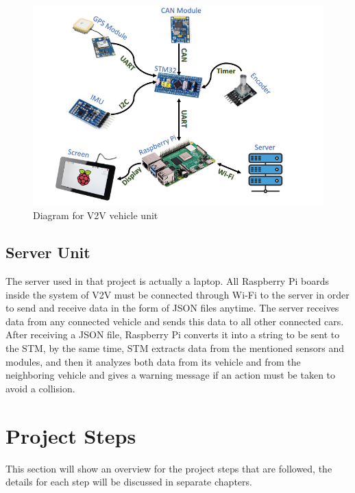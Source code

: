 \begin{figure}
    \centering
    \includegraphics[width = \textwidth]{figure/2_1_1.PNG}
    
    \caption{Diagram for V2V vehicle unit}
    \label{fig:vehicle-unit}
\end{figure}

\newpage
\subsection{Server Unit}
The server used in that project is actually a laptop. All Raspberry Pi boards inside the system of V2V must be connected through Wi-Fi to the server in order to send and receive data in the form of JSON files anytime. \newline
 The server receives data from any connected vehicle and sends this data to all other connected cars. After receiving a JSON file, Raspberry Pi converts it into a string to be sent to the STM, by the same time, STM extracts data from the mentioned sensors and modules, and then it analyzes both data from its vehicle and from the neighboring vehicle and gives a warning message if an action must be taken to avoid a collision.\newline
 
 \section{Project Steps}
 This section will show an overview for the project steps that are followed, the details for each step will be discussed in separate chapters. \newline
 
